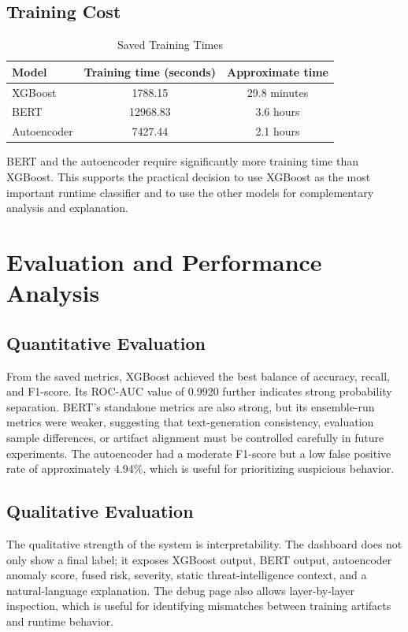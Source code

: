 \documentclass[12pt,a4paper]{article}
\begin{document}
\subsection{Training Cost}

\begin{table}[H]
\centering
\caption{Saved Training Times}
\label{tab:training_time}
\begin{tabular}{l c c}
\toprule
Model & Training time (seconds) & Approximate time \\
\midrule
XGBoost & 1788.15 & 29.8 minutes \\
BERT & 12968.83 & 3.6 hours \\
Autoencoder & 7427.44 & 2.1 hours \\
\bottomrule
\end{tabular}
\end{table}

BERT and the autoencoder require significantly more training time than XGBoost. This supports the practical decision to use XGBoost as the most important runtime classifier and to use the other models for complementary analysis and explanation.

\section{Evaluation and Performance Analysis}

\subsection{Quantitative Evaluation}

From the saved metrics, XGBoost achieved the best balance of accuracy, recall, and F1-score. Its ROC-AUC value of 0.9920 further indicates strong probability separation. BERT's standalone metrics are also strong, but its ensemble-run metrics were weaker, suggesting that text-generation consistency, evaluation sample differences, or artifact alignment must be controlled carefully in future experiments. The autoencoder had a moderate F1-score but a low false positive rate of approximately 4.94\%, which is useful for prioritizing suspicious behavior.

\subsection{Qualitative Evaluation}

The qualitative strength of the system is interpretability. The dashboard does not only show a final label; it exposes XGBoost output, BERT output, autoencoder anomaly score, fused risk, severity, static threat-intelligence context, and a natural-language explanation. The debug page also allows layer-by-layer inspection, which is useful for identifying mismatches between training artifacts and runtime behavior.
\end{document}

